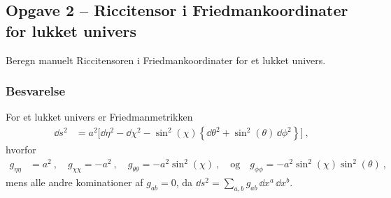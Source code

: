 \documentclass[../main.tex]{subfiles}
\begin{document}

\subsection{Opgave 2 -- Riccitensor i Friedmankoordinater for lukket univers}
\setcounter{subsection}{2}
\setcounter{equation}{0}

Beregn manuelt Riccitensoren i Friedmankoordinater for et lukket univers.


\subsubsection*{Besvarelse}

For et lukket univers er Friedmanmetrikken
\begin{align}
    \dd s^2 &= a^2 \Big[ \dd \eta^2 - \dd \chi^2 - \sin^2(\chi) \left\{ \dd \theta^2 + \sin^2(\theta)\, \dd \phi^2 \right\} \Big] \: ,
\end{align}
hvorfor
\begin{align}
    g_{\eta\eta} &= a^2 \: , \quad
    g_{\chi\chi} = - a^2 \: , \quad
    g_{\theta\theta} = - a^2 \sin^2(\chi) \: , \quad \text{og} \quad
    g_{\phi\phi} = - a^2 \sin^2(\chi) \sin^2(\theta) \: ,
\end{align}
mens alle andre kominationer af $g_{ab} = 0$, da $\dd s^2 = \sum_{a,b} g_{ab}\, \dd x^a\, \dd x^b$.
\end{document}
